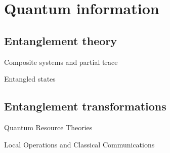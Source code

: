 \section{Quantum information}

\subsection{Entanglement theory}

\begin{frame}{Composite systems and partial trace}
    
\end{frame}

\begin{frame}{Entangled states}
    
\end{frame}

\subsection{Entanglement transformations}

\begin{frame}{Quantum Resource Theories}
    
\end{frame}

\begin{frame}{Local Operations and Classical Communications}
    
\end{frame}